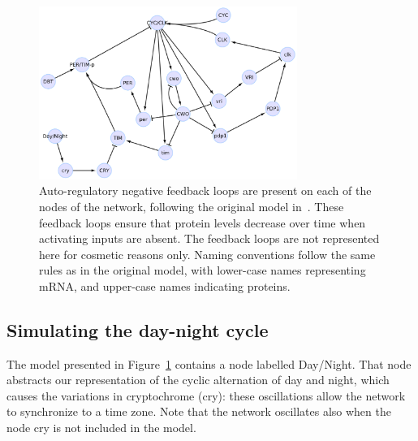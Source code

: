 \documentclass{bmcart}
\begin{document}
\def\drosophilaGraphScale{0.069}%
\begin{figure}[!htpb]
\begin{center}
\includegraphics[width=0.75\textwidth]{images/drosophila_model5}%
\end{center}
\caption{
Auto-regulatory negative feedback loops are present on each of the nodes of
the network, following the original model in~\cite{drosophila-ode-model}. These feedback loops ensure that
protein levels decrease over time when activating inputs are absent. The feedback loops are not represented here
for cosmetic reasons only.
Naming conventions follow the same rules
as in the original model, with lower-case names representing mRNA, and upper-case names indicating proteins.
}\label{fig:drosophila-model}
\end{figure}




\subsection{Simulating the day-night cycle}\label{suppl:repressilator}
The model presented in Figure~\ref{fig:drosophila-model} contains a node
labelled {\sf Day/Night}. That node abstracts our representation
of the cyclic alternation of day and night, which causes the variations
in cryptochrome ({\sf cry}): these oscillations allow the network
to synchronize to a time zone. Note that the network oscillates
also when the node {\sf cry} is not included in the model.
\end{document}
